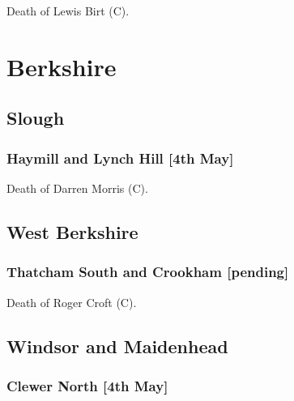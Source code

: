 \documentclass[a4paper,openany]{book}
\begin{document}
\begin{resultsiii}

Death of Lewis Birt (C).

\section{Berkshire}

\subsection*{Slough}

\subsubsection*{Haymill and Lynch Hill \hspace*{\fill}\nolinebreak[1]%
\enspace\hspace*{\fill}
[4th May]}


Death of Darren Morris (C).

\subsection*{West Berkshire}

\subsubsection*{Thatcham South and Crookham \hspace*{\fill}\nolinebreak[1]%
\enspace\hspace*{\fill}
[pending]}


Death of Roger Croft (C).

\subsection*{Windsor and Maidenhead}

\subsubsection*{Clewer North \hspace*{\fill}\nolinebreak[1]%
\enspace\hspace*{\fill}
[4th May]}


\end{resultsiii}
\end{document}
